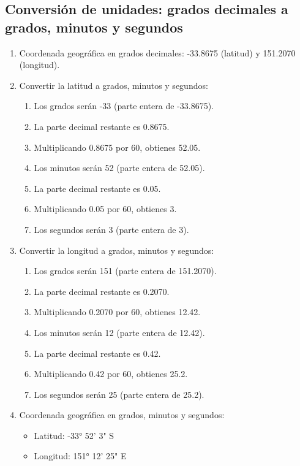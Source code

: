 \documentclass[
	12pt, %
	fleqn, %
	a4paper, %
	oneside, %
]{LegrandOrangeBook}
\begin{document}
\subsection*{Conversión de unidades: grados decimales a grados, minutos y segundos}
\begin{enumerate}
\item Coordenada geográfica en grados decimales: -33.8675 (latitud) y 151.2070 (longitud).

\item Convertir la latitud a grados, minutos y segundos:
\begin{enumerate}
\item Los grados serán -33 (parte entera de -33.8675).
\item La parte decimal restante es 0.8675.
\item Multiplicando 0.8675 por 60, obtienes 52.05.
\item Los minutos serán 52 (parte entera de 52.05).
\item La parte decimal restante es 0.05.
\item Multiplicando 0.05 por 60, obtienes 3.
\item Los segundos serán 3 (parte entera de 3).
\end{enumerate}

\item Convertir la longitud a grados, minutos y segundos:
\begin{enumerate}
\item Los grados serán 151 (parte entera de 151.2070).
\item La parte decimal restante es 0.2070.
\item Multiplicando 0.2070 por 60, obtienes 12.42.
\item Los minutos serán 12 (parte entera de 12.42).
\item La parte decimal restante es 0.42.
\item Multiplicando 0.42 por 60, obtienes 25.2.
\item Los segundos serán 25 (parte entera de 25.2).
\end{enumerate}

\item Coordenada geográfica en grados, minutos y segundos:
\begin{itemize}
\item Latitud: -33° 52' 3" S
\item Longitud: 151° 12' 25" E
\end{itemize}
\end{enumerate}
\end{document}
